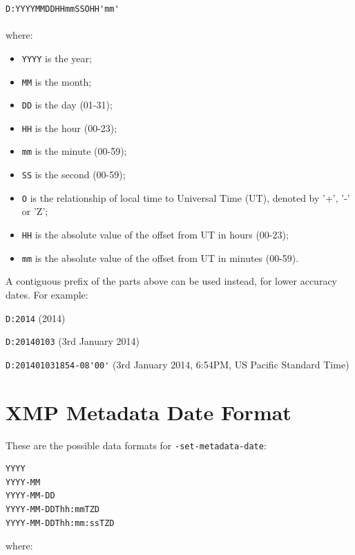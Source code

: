 \documentclass{book}
\begin{document}
\begin{framed}
\verb!D:YYYYMMDDHHmmSSOHH'mm'!\\\\where:

\begin{itemize}
  \item \texttt{YYYY} is the year;
  \item \texttt{MM} is the month;
  \item \texttt{DD} is the day (01-31);
  \item \texttt{HH} is the hour (00-23);
  \item \texttt{mm} is the minute (00-59);
  \item \texttt{SS} is the second (00-59);
  \item \texttt{O} is the relationship of local time to Universal Time (UT), denoted by '+', '-' or 'Z';
  \item \texttt{HH} is the absolute value of the offset from UT in hours (00-23);
  \item \texttt{mm} is the absolute value of the offset from UT in minutes (00-59).
\end{itemize}
\end{framed}

\noindent A contiguous prefix of the parts above can be used instead, for lower
accuracy dates. For example:

\begin{framed}
   \small\noindent\verb!D:2014! (2014)
   
   \vspace{1.5mm}
   \noindent\verb!D:20140103! (3rd January 2014)

   \vspace{1.5mm}
   \noindent\verb!D:201401031854-08'00'! (3rd January 2014, 6:54PM, US Pacific Standard Time)
   
\end{framed}

\section{XMP Metadata Date Format}
\label{xmpdate}


These are the possible data formats for \texttt{-set-metadata-date}:

\begin{verbatim}
YYYY
YYYY-MM
YYYY-MM-DD
YYYY-MM-DDThh:mmTZD
YYYY-MM-DDThh:mm:ssTZD
\end{verbatim}

\noindent where:
\end{document}
